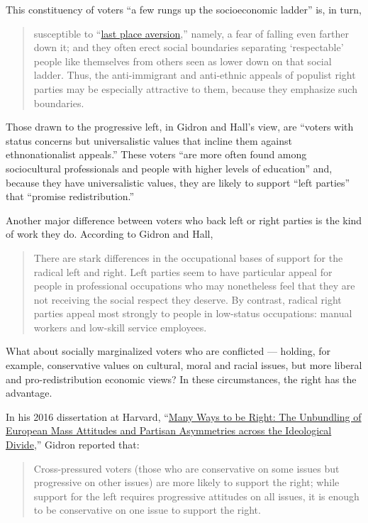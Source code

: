 This constituency of voters ``a few rungs up the socioeconomic ladder''
is, in turn,

\begin{quote}
susceptible to ``\href{https://www.nber.org/papers/w17234}{last place
aversion},'' namely, a fear of falling even farther down it; and they
often erect social boundaries separating `respectable' people like
themselves from others seen as lower down on that social ladder. Thus,
the anti-immigrant and anti-ethnic appeals of populist right parties may
be especially attractive to them, because they emphasize such
boundaries.
\end{quote}

Those drawn to the progressive left, in Gidron and Hall's view, are
``voters with status concerns but universalistic values that incline
them against ethnonationalist appeals.'' These voters ``are more often
found among sociocultural professionals and people with higher levels of
education'' and, because they have universalistic values, they are
likely to support ``left parties'' that ``promise redistribution.''

Another major difference between voters who back left or right parties
is the kind of work they do. According to Gidron and Hall,

\begin{quote}
There are stark differences in the occupational bases of support for the
radical left and right. Left parties seem to have particular appeal for
people in professional occupations who may nonetheless feel that they
are not receiving the social respect they deserve. By contrast, radical
right parties appeal most strongly to people in low-status occupations:
manual workers and low-skill service employees.
\end{quote}

What about socially marginalized voters who are conflicted --- holding,
for example, conservative values on cultural, moral and racial issues,
but more liberal and pro-redistribution economic views? In these
circumstances, the right has the advantage.

In his 2016 dissertation at Harvard,
``\href{https://dash.harvard.edu/bitstream/handle/1/33493265/GIDRON-DISSERTATION-2016.pdf?isAllowed=y\&sequence=4}{Many
Ways to be Right: The Unbundling of European Mass Attitudes and Partisan
Asymmetries across the Ideological Divide},'' Gidron reported that:

\begin{quote}
Cross-pressured voters (those who are conservative on some issues but
progressive on other issues) are more likely to support the right; while
support for the left requires progressive attitudes on all issues, it is
enough to be conservative on one issue to support the right.
\end{quote}

